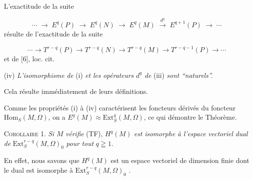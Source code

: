 L'exactitude de la suite

\begin{equation*}
\cdots \;\to\; E^q(P) \;\to\; E^q(N) \;\to\; E^q(M) \;\xrightarrow{\ d^q\ }\; E^{q+1}(P) \;\to\; \cdots
\end{equation*}
résulte de l'exactitude de la suite

\begin{equation*}
\cdots \to T^{r-q}(P) \to T^{r-q}(N) \to T^{r-q}(M) \to T^{r-q-1}(P) \to \cdots
\end{equation*}
et de [6], loc. cit.

(iv) \textit{L'isomorphisme de} (i) \textit{et les opérateurs $d^q$ de} (iii) \textit{sont ``naturels''.}

Cela résulte immédiatement de leurs définitions.



%
%
%
%
Comme les propriétés (i) à (iv) caractérisent les foncteurs dérivés du foncteur $\mathrm{Hom}_S(M, \Omega)$, on a $E^q(M) \approx \mathrm{Ext}_S^q(M, \Omega)$, ce qui démontre le Théorème.

\textsc{Corollaire} 1. \textit{Si $M$ vérifie} (TF), $H^q(M)$ \textit{est isomorphe à l'espace vectoriel dual de} $\mathrm{Ext}_S^{r-q}(M, \Omega)_0$ \textit{pour tout} $q \geqq 1$.

En effet, nous savons que $H^q(M)$ est un espace vectoriel de dimension finie dont le dual est isomorphe à $\mathrm{Ext}_S^{r-q}(M, \Omega)_0$ .

